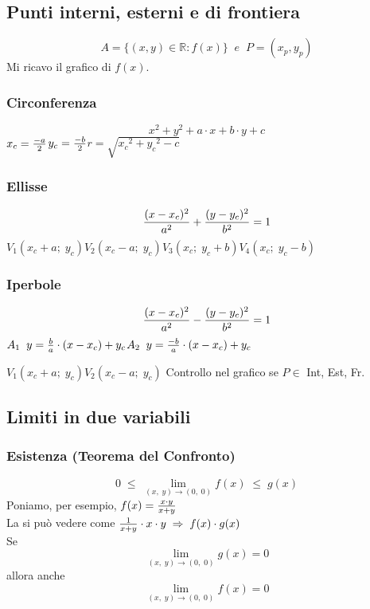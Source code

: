 \documentclass[a4paper, 10pt]{article}
\begin{document}
			\subsection{Punti interni, esterni e di frontiera}
					\[
						A = \{ (x, y) \in \mathbb{R} : f(x) \} \;\;e\;\; P = (x_p, y_p)
					\]
				Mi ricavo il grafico di $ f(x) $.
					\subsubsection{Circonferenza}
							\[
								x^2 + y^2 + a\cdot x + b\cdot y + c
	 						\]
 						\quad\quad\quad\quad\quad\quad\quad\quad\quad$ x_c = {-a\over 2} $\quad\quad\quad$ y_c = {-b\over 2} $\quad\quad\quad$ r = \sqrt{{x_c}^2 + {y_c}^2 - c} $
 					\subsubsection{Ellisse}
 							\[
 								{{(x - x_c)^2} \over a^2} + {{(y - y_c)^2} \over b^2} = 1
 							\]
 						\quad\quad\quad\quad$ V_1(x_c + a;\; y_c) $\quad$ V_2(x_c - a;\; y_c) $\quad$ V_3(x_c;\; y_c + b) $\quad$ V_4(x_c;\; y_c - b) $
 					\subsubsection{Iperbole}
 							\[
 							{{(x - x_c)^2} \over a^2} - {{(y - y_c)^2} \over b^2} = 1
 							\]
 						\quad\quad\quad\quad\quad$ A_1\;\; y = {b \over a} \cdot (x - x_c) + y_c $\quad\quad\quad$ A_2\;\; y = {-b \over a} \cdot (x - x_c) + y_c $\newpage
 						
 						\quad\quad\quad\quad\quad\quad\quad$ V_1(x_c + a;\; y_c) $\quad\quad\quad$ V_2(x_c - a;\; y_c) $\newline\newline
 				Controllo nel grafico se $ P \in $ Int, Est, Fr.
 				
 			\subsection{Limiti in due variabili}
 				\subsubsection{Esistenza (Teorema del Confronto)}
 						\[
 							0\; \leq \; \lim_{(x,\; y) \to (0,\; 0)} f(x)\; \leq \; g(x)
 						\]
 					Poniamo, per esempio, $ f(x) = {{x\cdot y} \over {x + y}} $\\
 					La si può vedere come $ {1 \over {x + y}}\cdot x\cdot y\; \Rightarrow\; f(x)\cdot g(x) $\\	
 					Se
 						\[
 							\lim_{(x,\; y) \to (0,\; 0)} g(x) = 0
 						\]  
 					allora anche 
 						\[ 
 							\lim_{(x,\; y) \to (0,\; 0)} f(x) = 0
 						\]
 						
\end{document}
